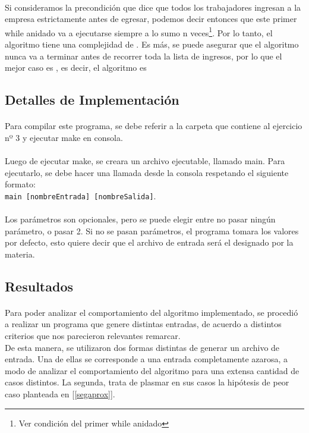\paragraph{}
Si consideramos la precondición que dice que todos los trabajadores ingresan a la empresa estrictamente antes de egresar, podemos decir entonces que este primer while anidado va a ejecutarse siempre a lo sumo n veces\footnote{Ver condición del primer while anidado}. Por lo tanto, el algoritmo tiene una complejidad de . Es más, se puede asegurar que el algoritmo nunca va a terminar antes de recorrer toda la lista de ingresos, por lo que el mejor caso es , es decir, el algoritmo es 



\subsection{Detalles de Implementación}

\paragraph{}
Para compilar este programa, se debe referir a la carpeta que contiene al ejercicio nº 3 y ejecutar make en consola.

\paragraph{}
Luego de ejecutar make, se creara un archivo ejecutable, llamado main. Para ejecutarlo, se debe hacer una llamada desde la consola respetando el siguiente formato:\\
\texttt{main [nombreEntrada] [nombreSalida]}.

\paragraph{}
Los parámetros son opcionales, pero se puede elegir entre no pasar ningún parámetro, o pasar 2. Si no se pasan parámetros, el programa tomara los valores por defecto, esto quiere decir que el archivo de entrada será el designado por la materia.


\subsection{Resultados}
\label{resultadosej3}

\paragraph{}
Para poder analizar el comportamiento del algoritmo implementado, se procedió a realizar un programa que genere distintas entradas, de acuerdo a distintos criterios que nos parecieron relevantes remarcar.\\
De esta manera, se utilizaron dos formas distintas de generar un archivo de entrada. Una de ellas se corresponde a una entrada completamente azarosa, a modo de analizar el comportamiento del algoritmo para una extensa cantidad de casos distintos. La segunda, trata de plasmar en sus casos la hipótesis de peor caso planteada en [\ref{segaprox}].

